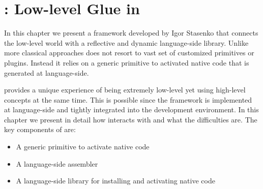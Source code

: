 
\chapter{\B: Low-level Glue in \PH}
\minitoc
\introduction

In this chapter we present \B a framework developed by Igor Stasenko that connects the low-level \VM world with a reflective and dynamic language-side library.
Unlike more classical approaches \B does not resort to vast set of customized \VM primitives or plugins.
Instead it relies on a generic primitive to activated native code that is generated at language-side.

\B provides a unique experience of being extremely low-level yet using high-level concepts at the same time.
This is possible since the framework is implemented at language-side and tightly integrated into the \PH development environment.
In this chapter we present in detail how \B interacts with \PH and what the difficulties are.
The key components of \B are:
\begin{itemize}[noitemsep]
	\item A generic primitive to activate native code
	\item \AsmJIT A language-side assembler
	\item A language-side library for installing and activating native code
\end{itemize}

